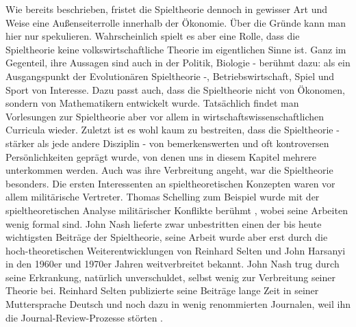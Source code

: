 Wie bereits beschrieben, fristet die Spieltheorie dennoch in gewisser Art und Weise eine Außenseiterrolle innerhalb der Ökonomie. Über die Gründe kann man hier nur spekulieren. Wahrscheinlich spielt es aber eine Rolle, dass die Spieltheorie keine volkswirtschaftliche Theorie im eigentlichen Sinne ist. Ganz im Gegenteil, ihre Aussagen sind auch in der Politik, Biologie - berühmt dazu: \textcite{Price1973} als ein Ausgangspunkt der Evolutionären Spieltheorie -, Betriebswirtschaft, Spiel und Sport von Interesse. Dazu passt auch, dass die Spieltheorie nicht von Ökonomen, sondern von Mathematikern entwickelt wurde. Tatsächlich findet man Vorlesungen zur Spieltheorie aber vor allem in wirtschaftswissenschaftlichen Curricula wieder. Zuletzt ist es wohl kaum zu bestreiten, dass die Spieltheorie - stärker als jede andere Disziplin - von bemerkenswerten und oft kontroversen Persönlichkeiten geprägt wurde, von denen uns in diesem Kapitel mehrere unterkommen werden. Auch was ihre Verbreitung angeht, war die Spieltheorie besonders. Die ersten Interessenten an spieltheoretischen Konzepten waren vor allem militärische Vertreter. Thomas Schelling zum Beispiel wurde mit der spieltheoretischen Analyse militärischer Konflikte berühmt \parencite{Schelling1960}, wobei seine Arbeiten wenig formal sind. John Nash lieferte zwar unbestritten einen der bis heute wichtigsten Beiträge der Spieltheorie, seine Arbeit wurde aber erst durch die hoch-theoretischen Weiterentwicklungen von Reinhard Selten und John Harsanyi in den 1960er und 1970er Jahren weitverbreitet bekannt. John Nash trug durch seine Erkrankung, natürlich unverschuldet, selbst wenig zur Verbreitung seiner Theorie bei. Reinhard Selten publizierte seine Beiträge lange Zeit in seiner Muttersprache Deutsch und noch dazu in wenig renommierten Journalen, weil ihn die Journal-Review-Prozesse störten \parencite[S. 215]{Frey2003}.


